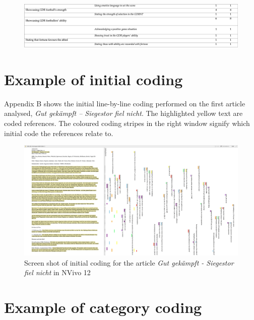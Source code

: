 \begin{landscape}
\begin{figure}[h]
\centering
\bigskip\bigskip\bigskip\bigskip\bigskip
\includegraphics[width=\linewidth]{mres/images/appendix/a6.png}
\end{figure}
\end{landscape}

\chapter{Example of initial coding}

Appendix B shows the initial line-by-line coding performed on the first article analysed, \textit{Gut gekämpft – Siegestor fiel nicht}. The highlighted yellow text are coded references. The coloured coding stripes in the right window signify which initial code the references relate to. 

\begin{landscape}
\begin{figure}[h]
\centering
\bigskip\bigskip\bigskip
\caption{Screen shot of initial coding for the article \textit{Gut gekämpft - Siegestor fiel nicht} in NVivo 12}
\includegraphics[width=\linewidth]{mres/images/appendix/b1.png}
\end{figure}
\end{landscape}

\chapter{Example of category coding}

